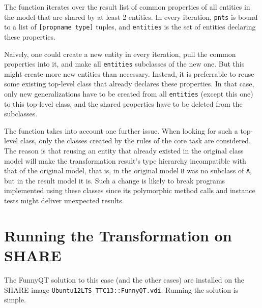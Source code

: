 \documentclass[11pt]{article}
\begin{document}
\begin{sloppypar}
  The function iterates over the result list of common properties of all
  entities in the model that are shared by at least 2 entities.  In every
  iteration, \verb|pnts| is bound to a list of \verb|[propname type]| tuples,
  and \verb|entities| is the set of entities declaring these properties.
\end{sloppypar}

Naively, one could create a new entity in every iteration, pull the common
properties into it, and make all \verb|entities| subclasses of the new one.
But this might create more new entities than necessary.  Instead, it is
preferrable to reuse some existing top-level class that already declares these
properties.  In that case, only new generalizations have to be created from all
\verb|entities| (except this one) to this top-level class, and the shared
properties have to be deleted from the subclasses.

The function takes into account one further issue.  When looking for such a
top-level class, only the classes created by the rules of the core task are
considered.  The reason is that reusing an entity that already existed in the
original class model will make the transformation result's type hierarchy
incompatible with that of the original model, that is, in the original model
\verb|B| was no subclass of \verb|A|, but in the result model it is.  Such a
change is likely to break programs implemented using these classes since its
polymorphic method calls and instance tests might deliver unexpected results.



\section{Running the Transformation on SHARE}
\label{sec:run-transformation}

The FunnyQT solution to this case (and the other cases) are installed on the
SHARE image \verb|Ubuntu12LTS_TTC13::FunnyQT.vdi|.  Running the solution is
simple.
\end{document}
